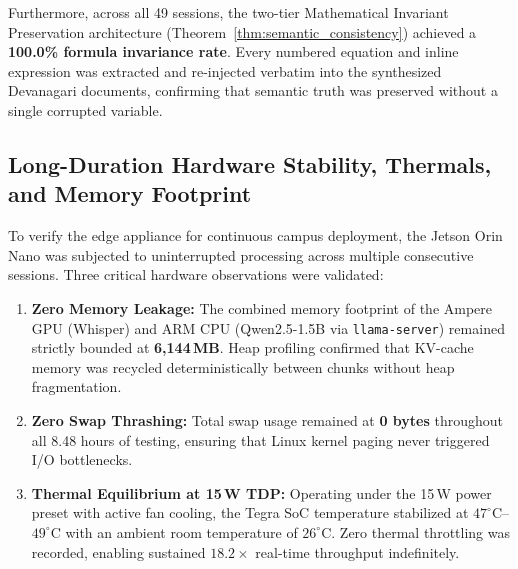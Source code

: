 \documentclass[11pt,a4paper,oneside]{report}
\begin{document}
Furthermore, across all 49 sessions, the two-tier Mathematical Invariant Preservation architecture (Theorem~\ref{thm:semantic_consistency}) achieved a \textbf{100.0\% formula invariance rate}. Every numbered equation and inline expression was extracted and re-injected verbatim into the synthesized Devanagari documents, confirming that semantic truth was preserved without a single corrupted variable.

\subsection{Long-Duration Hardware Stability, Thermals, and Memory Footprint}
To verify the edge appliance for continuous campus deployment, the Jetson Orin Nano was subjected to uninterrupted processing across multiple consecutive sessions. Three critical hardware observations were validated:
\begin{enumerate}[noitemsep]
    \item \textbf{Zero Memory Leakage:} The combined memory footprint of the Ampere GPU (Whisper) and ARM CPU (Qwen2.5-1.5B via \texttt{llama-server}) remained strictly bounded at \textbf{6,144\,MB}. Heap profiling confirmed that KV-cache memory was recycled deterministically between chunks without heap fragmentation.
    \item \textbf{Zero Swap Thrashing:} Total swap usage remained at \textbf{0 bytes} throughout all 8.48 hours of testing, ensuring that Linux kernel paging never triggered I/O bottlenecks.
    \item \textbf{Thermal Equilibrium at 15\,W TDP:} Operating under the 15\,W power preset with active fan cooling, the Tegra SoC temperature stabilized at $47^\circ\text{C}$--$49^\circ\text{C}$ with an ambient room temperature of $26^\circ\text{C}$. Zero thermal throttling was recorded, enabling sustained $18.2\times$ real-time throughput indefinitely.
\end{enumerate}
\end{document}
